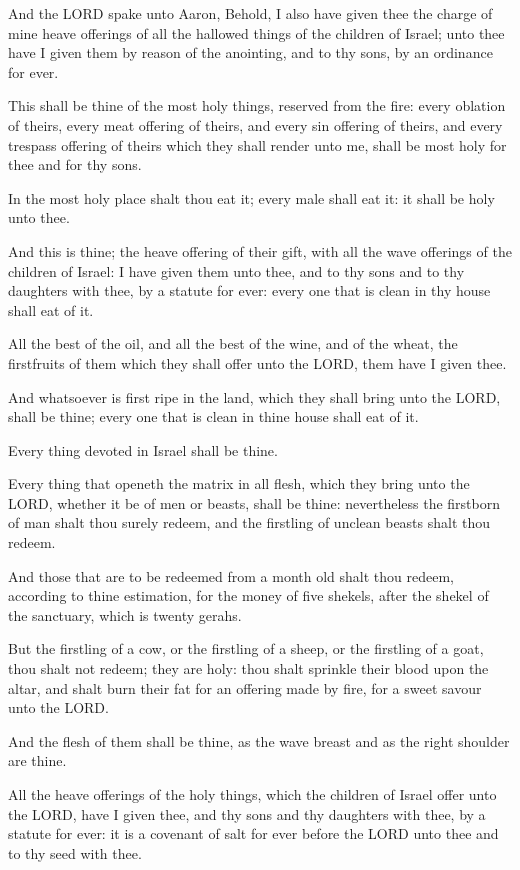 \verse And the LORD spake unto Aaron, Behold, I also have given thee the
charge of mine heave offerings of all the hallowed things of the
children of Israel; unto thee have I given them by reason of the
anointing, and to thy sons, by an ordinance for ever.

\verse This shall be thine of the most holy things, reserved from the
fire: every oblation of theirs, every meat offering of theirs, and
every sin offering of theirs, and every trespass offering of theirs
which they shall render unto me, shall be most holy for thee and for
thy sons.

\verse In the most holy place shalt thou eat it; every male shall eat
it: it shall be holy unto thee.

\verse And this is thine; the heave offering of their gift, with all
the wave offerings of the children of Israel: I have given them unto
thee, and to thy sons and to thy daughters with thee, by a statute for
ever: every one that is clean in thy house shall eat of it.

\verse All the best of the oil, and all the best of the wine, and of
the wheat, the firstfruits of them which they shall offer unto the
LORD, them have I given thee.

\verse And whatsoever is first ripe in the land, which they shall bring
unto the LORD, shall be thine; every one that is clean in thine house
shall eat of it.

\verse Every thing devoted in Israel shall be thine.

\verse Every thing that openeth the matrix in all flesh, which they
bring unto the LORD, whether it be of men or beasts, shall be thine:
nevertheless the firstborn of man shalt thou surely redeem, and the
firstling of unclean beasts shalt thou redeem.

\verse And those that are to be redeemed from a month old shalt thou
redeem, according to thine estimation, for the money of five shekels,
after the shekel of the sanctuary, which is twenty gerahs.

\verse But the firstling of a cow, or the firstling of a sheep, or the
firstling of a goat, thou shalt not redeem; they are holy: thou shalt
sprinkle their blood upon the altar, and shalt burn their fat for an
offering made by fire, for a sweet savour unto the LORD.

\verse And the flesh of them shall be thine, as the wave breast and as
the right shoulder are thine.

\verse All the heave offerings of the holy things, which the children
of Israel offer unto the LORD, have I given thee, and thy sons and thy
daughters with thee, by a statute for ever: it is a covenant of salt
for ever before the LORD unto thee and to thy seed with thee.

